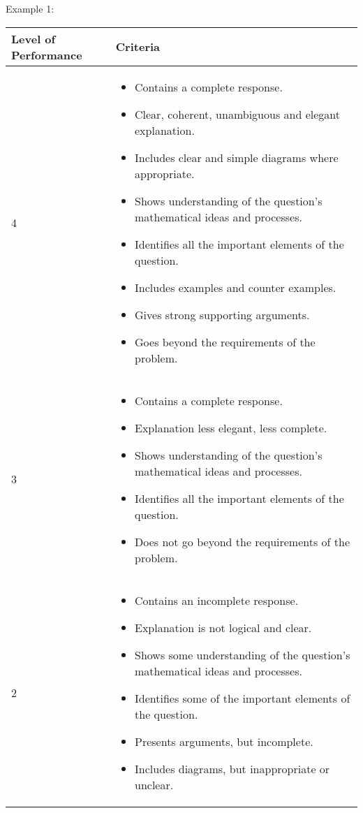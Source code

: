 Example 1:
\begin{table}[H]
 \begin{center}
  \begin{tabular}{|p{3cm}|p{8.5cm}|} \hline
\textbf{Level of Performance}& \textbf{Criteria} \\ \hline
4 &
\begin{itemize}[noitemsep]
\item Contains a complete response.
\item Clear, coherent, unambiguous and elegant explanation.
\item Includes clear and simple diagrams where appropriate.
\item Shows understanding of the question’s mathematical ideas and processes.
\item Identifies all the important elements of the question.
\item Includes examples and counter examples.
\item Gives strong supporting arguments.
\item Goes beyond the requirements of the problem. 
   \end{itemize} \\ \hline
3 & 
\begin{itemize}[noitemsep]
\item Contains a complete response.
\item Explanation less elegant, less complete.
\item Shows understanding of the question’s mathematical ideas and processes.
\item Identifies all the important elements of the question.
\item Does not go beyond the requirements of the problem.
\end{itemize} \\ \hline
2 &
\begin{itemize}[noitemsep]
\item Contains an incomplete response.
\item Explanation is not logical and clear.
\item Shows some understanding of the question’s mathematical ideas and processes.
\item Identifies some of the important elements of the question.
\item Presents arguments, but incomplete.
\item Includes diagrams, but inappropriate or unclear.
\end{itemize} \\ \hline

\end{tabular}
\end{center}
\end{table}
